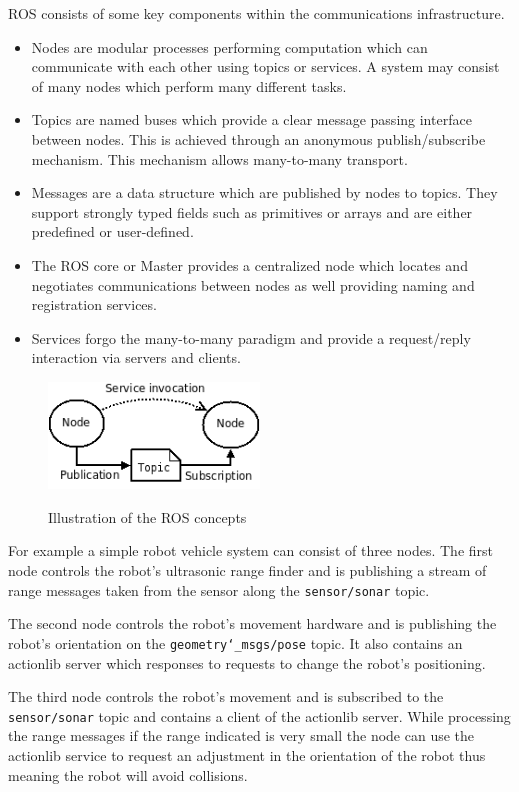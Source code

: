\documentclass{mproj}
\begin{document}
ROS consists of some key components within the communications infrastructure.
\begin{itemize}
  \item Nodes are modular processes performing computation which can communicate with each other using topics or services. A system may consist of many nodes which perform many different tasks.
  \item Topics are named buses which provide a clear message passing interface between nodes. This is achieved through an anonymous publish/subscribe mechanism. This mechanism allows many-to-many transport.
  \item Messages are a data structure which are published by nodes to topics. They support strongly typed fields such as primitives or arrays and are either predefined or user-defined.
  \item The ROS core or Master provides a centralized node which locates and negotiates communications between nodes as well providing naming and registration services.
  \item Services forgo the many-to-many paradigm and provide a request/reply interaction via servers and clients.

\end{itemize}

\begin{figure}[h]
  \caption{Illustration of the ROS concepts}
  \centering
  \includegraphics[width=0.5\textwidth]{images/ROS_basic_concepts.png}
  \label{fig:ROS diagram}
\end{figure}

For example a simple robot vehicle system can consist of three nodes. The first node controls the robot's ultrasonic range finder and is publishing a stream of range messages taken from the sensor along the \texttt{sensor/sonar} topic.

The second node controls the robot's movement hardware and is publishing the robot's orientation on the \texttt{geometry\char`_msgs/pose} topic. It also contains an actionlib server which responses to requests to change the robot's positioning. 

The third node controls the robot's movement and is subscribed to the \texttt{sensor/sonar} topic and contains a client of the actionlib server. While processing the range messages if the range indicated is very small the node can use the actionlib service to request an adjustment in the orientation of the robot thus meaning the robot will avoid collisions. 
\end{document}
